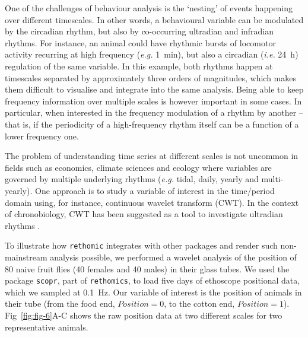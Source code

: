 \documentclass[10pt,letterpaper]{article}\usepackage[]{graphicx}\usepackage[]{color}
\begin{document}
One of the challenges of behaviour analysis is the `nesting' of events happening over different timescales.
In other words, a behavioural variable can be modulated by the circadian rhythm, but also by co-occurring ultradian and infradian rhythms.
For instance, an animal could have rhythmic bursts of locomotor activity recurring at high frequency (\emph{e.g.} 1~min), but also a circadian  (\emph{i.e.} 24~h) regulation of the same variable.
In this example, both rhythms happen at timescales separated by approximately three orders of magnitudes, which makes them difficult to visualise and integrate into the same analysis.
Being able to keep frequency information over multiple scales is however important in some cases.
In particular, when interested in the frequency modulation of a rhythm by another --
that is, if the periodicity of a high-frequency rhythm itself can be a function of a lower frequency one.

The problem of understanding time series at different scales is not uncommon in fields such as economics\cite{aguiar-conraria_business_2011}, climate sciences\cite{lau_climate_1995} and ecology\cite{cazelles_wavelet_2008} where variables are governed by multiple underlying rhythms (\emph{e.g.} tidal, daily, yearly and multi-yearly).
One approach is to study a variable of interest in the time/period domain using, for instance, continuous wavelet transform (CWT)\cite{grossmann_decomposition_1984}.
In the context of chronobiology, CWT has been suggested as a tool to investigate ultradian rhythms \cite{leise_wavelet_2013}.

To illustrate how \texttt{rethomic} integrates with other packages and render such non-mainstream analysis possible,
we performed a wavelet analysis of the position of 80 naive fruit flies (40 females and 40 males) in their glass tubes.
We used the package \texttt{scopr}, part of \texttt{rethomics}, to load five days of ethoscope positional data, which we sampled at 0.1~Hz.
Our variable of interest is the position of animals in their tube (from the food end, $Position = 0$,  to the cotton end, $Position = 1$).
Fig~\ref{fig:fig-6}A-C shows the raw position data at two different scales for two representative animals.
\end{document}
